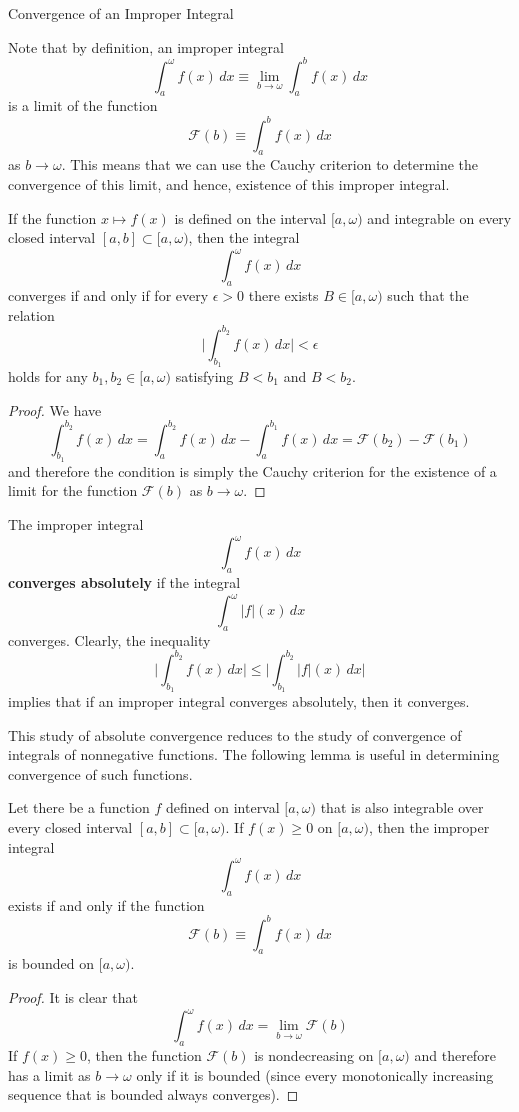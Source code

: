   Convergence of an Improper Integral

  Note that by definition, an improper integral 
  \[\int_a^\omega f(x)\,dx \equiv \lim_{b \rightarrow \omega} \int_a^b f(x) \,dx\]
  is a limit of the function 
  \[\mathcal{F}(b) \equiv \int_a^b f(x)\,dx\]
  as $b \rightarrow \omega$. This means that we can use the Cauchy criterion to determine the convergence of this limit, and hence, existence of this improper integral. 

  \begin{theorem}
  If the function $x \mapsto f(x)$ is defined on the interval $[a, \omega)$ and integrable on every closed interval $[a, b] \subset [a, \omega)$, then the integral 
  \[\int_a^\omega f(x)\,dx\]
  converges if and only if for every $\epsilon > 0$ there exists $B \in [a, \omega)$ such that the relation
  \[\Bigg| \int_{b_1}^{b_2} f(x)\,dx \bigg| < \epsilon\]
  holds for any $b_1, b_2 \in [a, \omega)$ satisfying $B < b_1$ and $B < b_2$. 
  \end{theorem}
  \begin{proof}
  We have
  \[\int_{b_1}^{b_2} f(x)\,dx = \int_a^{b_2} f(x)\,dx - \int_a^{b_1} f(x)\,dx = \mathcal{F}(b_2) - \mathcal{F}(b_1)\]
  and therefore the condition is simply the Cauchy criterion for the existence of a limit for the function $\mathcal{F}(b)$ as $b \rightarrow \omega$. 
  \end{proof}

  \begin{definition}
    The improper integral 
    \[\int_a^\omega f(x)\,dx\]
    \textbf{converges absolutely} if the integral
    \[\int_a^\omega |f|(x)\,dx\]
    converges. Clearly, the inequality
    \[\Bigg| \int_{b_1}^{b_2} f(x)\,dx \Bigg| \leq \Bigg| \int_{b_1}^{b_2} |f|(x)\,dx \Bigg|\]
    implies that if an improper integral converges absolutely, then it converges. 
  \end{definition}

  This study of absolute convergence reduces to the study of convergence of integrals of nonnegative functions. The following lemma is useful in determining convergence of such functions. 

  \begin{lemma}
    Let there be a function $f$ defined on interval $[a, \omega)$ that is also integrable over every closed interval $[a, b] \subset [a, \omega)$. If $f(x) \geq 0$ on $[a, \omega)$, then the improper integral 
    \[\int_a^\omega f(x)\,dx\]
    exists if and only if the function 
    \[\mathcal{F}(b) \equiv \int_a^b f(x)\,dx\]
    is bounded on $[a, \omega)$. 
  \end{lemma}
  \begin{proof}
  It is clear that 
  \[\int_a^\omega f(x)\,dx = \lim_{b \rightarrow \omega} \mathcal{F}(b)\]
  If $f(x)\geq 0$, then the function $\mathcal{F}(b)$ is nondecreasing on $[a, \omega)$ and therefore has a limit as $b \rightarrow \omega$ only if it is bounded (since every monotonically increasing sequence that is bounded always converges). 
  \end{proof}

